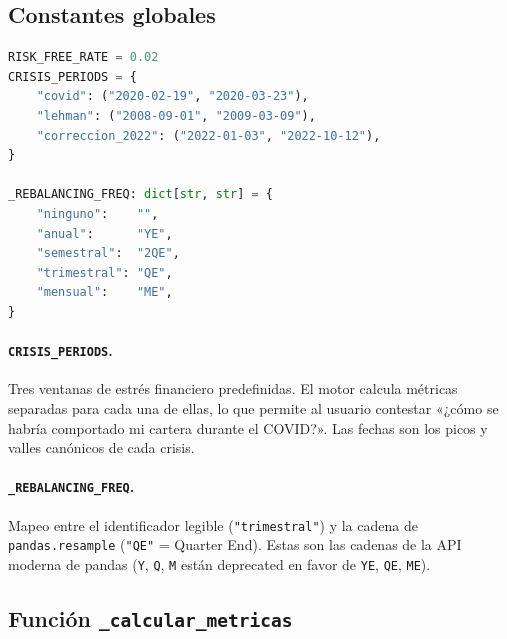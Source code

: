 \documentclass[11pt,a4paper]{book}
\begin{document}
\subsection{Constantes globales}

\begin{lstlisting}[language=Python]
RISK_FREE_RATE = 0.02
CRISIS_PERIODS = {
    "covid": ("2020-02-19", "2020-03-23"),
    "lehman": ("2008-09-01", "2009-03-09"),
    "correccion_2022": ("2022-01-03", "2022-10-12"),
}

_REBALANCING_FREQ: dict[str, str] = {
    "ninguno":    "",
    "anual":      "YE",
    "semestral":  "2QE",
    "trimestral": "QE",
    "mensual":    "ME",
}
\end{lstlisting}

\paragraph{\texttt{CRISIS\_PERIODS}.} Tres ventanas de estrés financiero predefinidas. El motor calcula métricas separadas para cada una de ellas, lo que permite al usuario contestar «¿cómo se habría comportado mi cartera durante el COVID?». Las fechas son los picos y valles canónicos de cada crisis.

\paragraph{\texttt{\_REBALANCING\_FREQ}.} Mapeo entre el identificador legible (\texttt{"trimestral"}) y la cadena de \texttt{pandas.resample} (\texttt{"QE"} = Quarter End). Estas son las cadenas de la API moderna de pandas (\texttt{Y}, \texttt{Q}, \texttt{M} están deprecated en favor de \texttt{YE}, \texttt{QE}, \texttt{ME}).

\subsection{Función \texttt{\_calcular\_metricas}}
\end{document}
